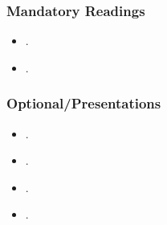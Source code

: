 \documentclass[abstract=on,parskip=full,headings=standardclasses,fontsize=11pt,paper=a4]{scrartcl}
\begin{document}
\subsubsection*{Mandatory Readings}
\begin{itemize}
\item {}.
\item {}.
\end{itemize}


\subsubsection*{Optional/Presentations}
\begin{itemize}
\item {}.
\item {}.
\item {}.
\item {}.
\end{itemize}

\end{document}
